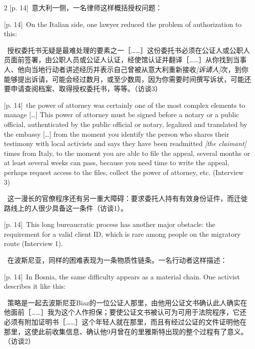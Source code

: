 \documentclass[10pt,a4paper]{article}
\begin{document}
\begin{paracol}{2}
{\scriptsize\color{gray} [p. 14]}\ 意大利一侧，一名律师这样概括授权问题：\par
\switchcolumn
{\scriptsize\color{gray} [p. 14]}\ On the Italian side, one lawyer reduced the problem of authorization to this:\par
\switchcolumn*
{\scriptsize\color{gray} [p. 14]}\ 授权委托书无疑是最难处理的要素之一［……］这份委托书必须在公证人或公职人员面前签署，由公职人员或公证人认证，经使馆认证并翻译［……］从你找到当事人、他向当地行动者讲述经历并表示自己曾被从意大利重新接收\textit{[诉请人]}次，到你能够提出诉请，可能会经过数月，或至少数周，因为你需要时间撰写诉状，可能还要申请查阅档案、取得授权委托书，等等。（访谈3）\par
\switchcolumn
{\scriptsize\color{gray} [p. 14]}\ the power of attorney was certainly one of the most complex elements to manage […] This power of attorney must be signed before a notary or a public official, authenticated by the public official or notary, legalized and translated by the embassy […] from the moment you identify the person who shares their testimony with local activists and says they have been readmitted \textit{[the claimant]} times from Italy, to the moment you are able to file the appeal, several months or at least several weeks can pass, because you need time to write the appeal, perhaps request access to the files, collect the power of attorney, etc. (Interview 3)\par
\switchcolumn*
{\scriptsize\color{gray} [p. 14]}\ 这一漫长的官僚程序还有另一重大障碍：要求委托人持有有效身份证件，而迁徙路线上的人很少具备这一条件（访谈1）。\par
\switchcolumn
{\scriptsize\color{gray} [p. 14]}\ This long bureaucratic process has another major obstacle: the requirement for a valid client ID, which is rare among people on the migratory route (Interview 1).\par
\switchcolumn*
{\scriptsize\color{gray} [p. 14]}\ 在波斯尼亚，同样的困难表现为一条物质性链条。一名行动者这样描述：\par
\switchcolumn
{\scriptsize\color{gray} [p. 14]}\ In Bosnia, the same difficulty appears as a material chain. One activist describes it like this:\par
\switchcolumn*
{\scriptsize\color{gray} [p. 14]}\ 策略是一起去波斯尼亚Biaz的一位公证人那里，由他用公证文书确认此人确实在他面前［……］我为这个人作担保；要使公证文书被认可为可用于法院程序，它还必须有附加证明书［……］这个年轻人就在那里，而且有经过公证的文件证明他在那里，这使此前收集信息、确认他9月曾在的里雅斯特出现的整个过程有了意义。（访谈2）\par

\end{paracol}
\end{document}
